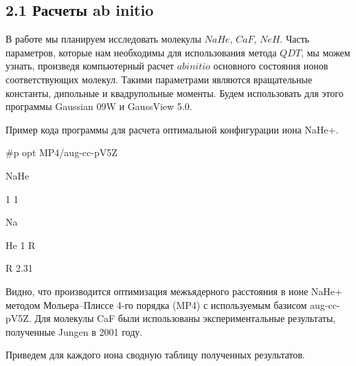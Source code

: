 \subsection[2.1 Расчеты ab
initio]{2.1 Расчеты \foreignlanguage{english}{ab}
\foreignlanguage{english}{initio}}

В работе мы планируем исследовать молекулы $NaHe$, $CaF$, $NeH$. 
Часть параметров, которые нам необходимы для использования метода $QDT$, мы можем узнать, произведя компьютерный расчет $ab initio$ основного состояния ионов соответствующих молекул.
Такими параметрами являются вращательные константы, дипольные и квадрупольные моменты. 
Будем использовать для этого программы \foreignlanguage{english}{Gaussian 09W} и \foreignlanguage{english}{GaussView} 5.0.

Пример кода программы для расчета оптимальной конфигурации иона
\foreignlanguage{english}{NaHe}+.

\foreignlanguage{english}{\#p opt MP4/aug-cc-pV5Z}

\foreignlanguage{english}{NaHe}

\foreignlanguage{english}{1 1}

\foreignlanguage{english}{Na \ \ \ \ \ \ \ \ \ \ \ \ }

\foreignlanguage{english}{He 1 R}

\foreignlanguage{english}{R 2.31}

Видно, что производится оптимизация межъядерного расстояния в ионе \foreignlanguage{english}{NaHe}+ методом Мольера--Плиссе 4-го порядка (\foreignlanguage{english}{MP}4) с используемым базисом aug-cc-pV5Z. 
Для молекулы \foreignlanguage{english}{CaF} были использованы экспериментальные результаты,
полученные \foreignlanguage{english}{Jungen} в 2001 году.

Приведем для каждого иона сводную таблицу полученных результатов.

